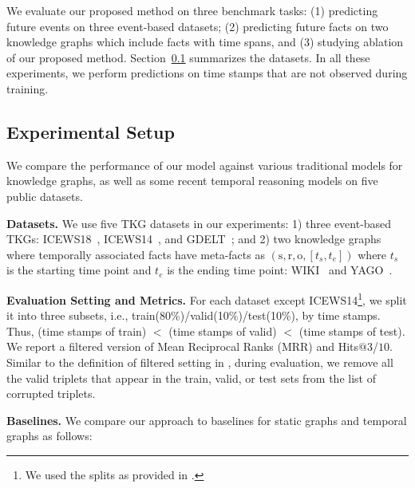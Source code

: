 \documentclass[11pt,a4paper]{article}
\newcommand{\para}[1]{\smallskip\noindent\textbf{#1}}
\newcommand{\bs}{\mathrm{s}}
\newcommand{\br}{\mathrm{r}}
\newcommand{\bo}{\mathrm{o}}
\begin{document}
We evaluate our proposed method on three benchmark tasks: (1) predicting future events on three event-based datasets; (2) predicting future facts on two knowledge graphs which include facts with time spans, and (3) studying ablation of our proposed method.
Section~\ref{exp:setup} summarizes the datasets.
In all these experiments, we perform predictions on time stamps that are not observed during training.







\subsection{Experimental Setup}
\label{exp:setup}
We compare the performance of our model against various traditional models for knowledge graphs, as well as some recent temporal reasoning models on five public datasets.

\para{Datasets.}
We use five TKG datasets in our experiments: 1) three event-based TKGs: ICEWS18~\citep{boschee2015icews}, ICEWS14~\citep{Trivedi2017KnowEvolveDT}, and GDELT~\citep{leetaru2013gdelt}; and 2) two knowledge graphs where temporally associated facts have meta-facts as $(\bs,\br,\bo, [t_s, t_e])$ where $t_s$ is the starting time point and $t_e$ is the ending time point:  WIKI~\citep{leblay2018deriving} and YAGO~\citep{Mahdisoltani2014YAGO3AK}.



\para{Evaluation Setting and Metrics.}
For each dataset 
except ICEWS14\footnote{We used the splits as provided in \citep{Trivedi2017KnowEvolveDT}.}, 
we split it into three subsets, i.e., train(80\%)/valid(10\%)/test(10\%), by time stamps. Thus, (time stamps of train) $<$ (time stamps of valid) $<$ (time stamps of test).
We report a filtered version of Mean Reciprocal Ranks (MRR) and Hits$@3$/$10$. 
Similar to the definition of filtered setting in \citep{Bordes2013TranslatingEF}, during evaluation, we remove all the valid triplets that appear in the train, valid, or test sets from the list of corrupted triplets.





\para{Baselines.}
We compare our approach to baselines for static graphs and temporal graphs as follows:
\end{document}
